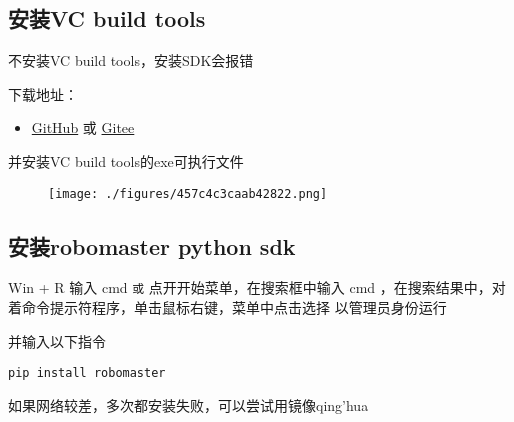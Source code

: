 
\subsection{安装VC build tools}
不安装VC build tools，安装SDK会报错

下载地址：\begin{itemize}
\item \href{https://github.com/dji-sdk/robomaster-sdk}{GitHub} 或 \href{https://gitee.com/xitinglin/RoboMaster-SDK}{Gitee}
\end{itemize}

并安装VC build tools的exe可执行文件

\begin{figure}[ht]
\centering
\texttt{[image: ./figures/457c4c3caab42822.png]}
\caption{} \label{fig_PyRM1_1}
\end{figure}

\subsection{安装robomaster python sdk}
Win + R 输入 cmd 
\verb|或|
点开开始菜单，在搜索框中输入 cmd ，在搜索结果中，对着命令提示符程序，单击鼠标右键，菜单中点击选择 以管理员身份运行 

并输入以下指令

\begin{lstlisting}[language=pythonC]
pip install robomaster
\end{lstlisting}

如果网络较差，多次都安装失败，可以尝试用镜像qing'hua